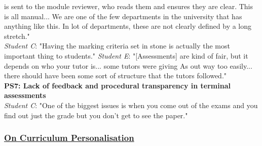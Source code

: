 is sent to the module reviewer, who reads them and ensures they are clear. This is all manual... 
We are one of the few departments in the university that has anything like this. In lot of departments, 
these are not clearly defined by a long stretch."\\
\textit{Student C}: "Having the marking criteria set in stone is actually the most important thing 
to students."
\textit{Student E}: "[Assessments] are kind of fair, but it depends on who your tutor is... 
some tutors were giving As out way too easily... there should have been some sort of structure that 
the tutors followed."
\vspace{0.25cm}\\
\textbf{PS7: Lack of feedback and procedural transparency in terminal assessments}\\
\textit{Student C}: "One of the biggest issues is when you come out of the exams and you find out 
just the grade but you don't get to see the paper."

\subsubsection{\underline{On Curriculum Personalisation}}

